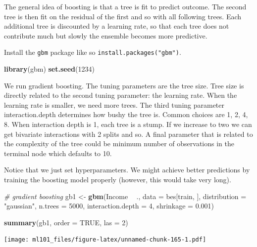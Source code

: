 \documentclass[]{article}
\newenvironment{Shaded}{\begin{snugshade}}{\end{snugshade}}
\newcommand{\CommentTok}[1]{\textcolor[rgb]{0.56,0.35,0.01}{\textit{#1}}}
\newcommand{\DataTypeTok}[1]{\textcolor[rgb]{0.13,0.29,0.53}{#1}}
\newcommand{\DecValTok}[1]{\textcolor[rgb]{0.00,0.00,0.81}{#1}}
\newcommand{\FloatTok}[1]{\textcolor[rgb]{0.00,0.00,0.81}{#1}}
\newcommand{\KeywordTok}[1]{\textcolor[rgb]{0.13,0.29,0.53}{\textbf{#1}}}
\newcommand{\NormalTok}[1]{#1}
\newcommand{\OperatorTok}[1]{\textcolor[rgb]{0.81,0.36,0.00}{\textbf{#1}}}
\newcommand{\OtherTok}[1]{\textcolor[rgb]{0.56,0.35,0.01}{#1}}
\newcommand{\StringTok}[1]{\textcolor[rgb]{0.31,0.60,0.02}{#1}}
\begin{document}
The general idea of boosting is that a tree is fit to predict outcome. The second tree is then fit on the residual of the first and so with all following trees. Each additional tree is discounted by a learning rate, so that each tree does not contribute much but slowly the ensemble becomes more predictive.

Install the \texttt{gbm} package like so \texttt{install.packages("gbm")}.

\begin{Shaded}
\begin{Highlighting}[]
\KeywordTok{library}\NormalTok{(gbm)}
\KeywordTok{set.seed}\NormalTok{(}\DecValTok{1234}\NormalTok{)}
\end{Highlighting}
\end{Shaded}

We run gradient boosting. The tuning parameters are the tree size. Tree size is directly related to the second tuning parameter: the learning rate. When the learning rate is smaller, we need more trees. The third tuning parameter interaction.depth determines how bushy the tree is. Common choices are 1, 2, 4, 8. When interaction depth is 1, each tree is a stump. If we increase to two we can get bivariate interactions with 2 splits and so. A final parameter that is related to the complexity of the tree could be minimum number of observations in the terminal node which defaults to 10.

Notice that we just set hyperparameters. We might achieve better predictions by training the boosting model properly (however, this would take very long).

\begin{Shaded}
\begin{Highlighting}[]
\CommentTok{# gradient boosting}
\NormalTok{gb1 <-}\StringTok{ }\KeywordTok{gbm}\NormalTok{(Income }\OperatorTok{~}\StringTok{ }\NormalTok{., }\DataTypeTok{data =}\NormalTok{ bes[train, ], }
           \DataTypeTok{distribution =} \StringTok{"gaussian"}\NormalTok{, }
           \DataTypeTok{n.trees =} \DecValTok{5000}\NormalTok{, }
           \DataTypeTok{interaction.depth =} \DecValTok{4}\NormalTok{,}
           \DataTypeTok{shrinkage =} \FloatTok{0.001}\NormalTok{)}

\KeywordTok{summary}\NormalTok{(gb1, }\DataTypeTok{order =} \OtherTok{TRUE}\NormalTok{, }\DataTypeTok{las =} \DecValTok{2}\NormalTok{)}
\end{Highlighting}
\end{Shaded}

\texttt{[image: ml101\_files/figure-latex/unnamed-chunk-165-1.pdf]}
\end{document}

